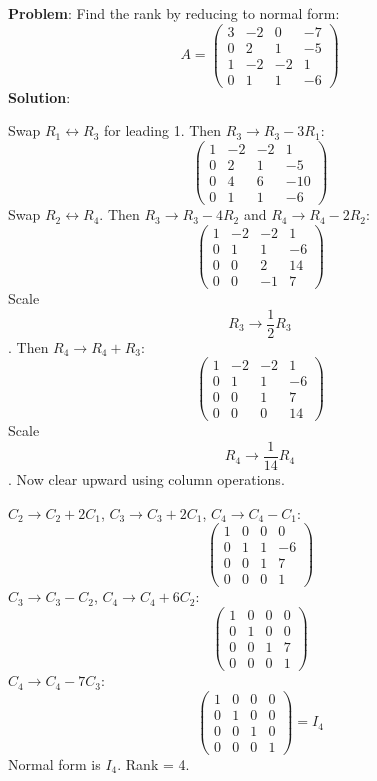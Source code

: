 \documentclass[
]{article}
\begin{document}
\textbf{Problem}: Find the rank by reducing to normal form:
\[
A =
\begin{pmatrix}
3 & -2 & 0 & -7 \\
0 & 2 & 1 & -5 \\
1 & -2 & -2 & 1 \\
0 & 1 & 1 & -6
\end{pmatrix}
\]
\textbf{Solution}:

Swap \(R_1 \leftrightarrow R_3\) for leading 1. Then
\(R_3 \to R_3 - 3R_1\):
\[
\begin{pmatrix}
1 & -2 & -2 & 1 \\
0 & 2 & 1 & -5 \\
0 & 4 & 6 & -10 \\
0 & 1 & 1 & -6
\end{pmatrix}
\]
Swap \(R_2 \leftrightarrow R_4\). Then \(R_3 \to R_3 - 4R_2\) and
\(R_4 \to R_4 - 2R_2\):
\[
\begin{pmatrix}
1 & -2 & -2 & 1 \\
0 & 1 & 1 & -6 \\
0 & 0 & 2 & 14 \\
0 & 0 & -1 & 7
\end{pmatrix}
\]
Scale
\[
R_3 \to \frac{1}{2}R_3
\]
. Then \(R_4 \to R_4 + R_3\):
\[
\begin{pmatrix}
1 & -2 & -2 & 1 \\
0 & 1 & 1 & -6 \\
0 & 0 & 1 & 7 \\
0 & 0 & 0 & 14
\end{pmatrix}
\]
Scale
\[
R_4 \to \frac{1}{14}R_4
\]
. Now clear upward using column operations.

\(C_2 \to C_2 + 2C_1\), \(C_3 \to C_3 + 2C_1\), \(C_4 \to C_4 - C_1\):
\[
\begin{pmatrix}
1 & 0 & 0 & 0 \\
0 & 1 & 1 & -6 \\
0 & 0 & 1 & 7 \\
0 & 0 & 0 & 1
\end{pmatrix}
\]
\(C_3 \to C_3 - C_2\), \(C_4 \to C_4 + 6C_2\):
\[
\begin{pmatrix}
1 & 0 & 0 & 0 \\
0 & 1 & 0 & 0 \\
0 & 0 & 1 & 7 \\
0 & 0 & 0 & 1
\end{pmatrix}
\]
\(C_4 \to C_4 - 7C_3\):
\[
\begin{pmatrix}
1 & 0 & 0 & 0 \\
0 & 1 & 0 & 0 \\
0 & 0 & 1 & 0 \\
0 & 0 & 0 & 1
\end{pmatrix} = I_4
\]
Normal form is \(I_4\). Rank = 4.
\end{document}
